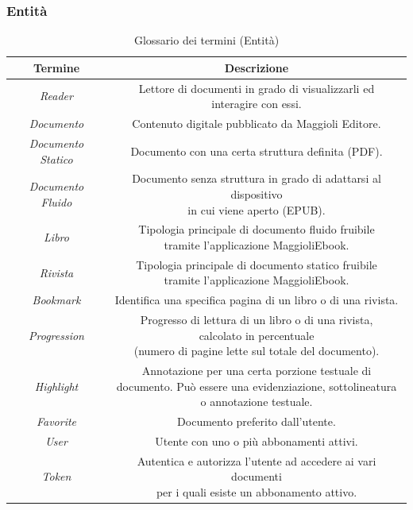 \subsubsection*{Entità}
\begin{table}[H]
\centering
    \begin{tabular}{|c|c|}
         \hline
         \textbf{Termine} & \textbf{Descrizione}\\
         \hline
         \textit{Reader} & \specialcell{Lettore di documenti in grado di visualizzarli ed \\interagire con essi.}\\
         \hline
         \textit{Documento} & Contenuto digitale pubblicato da Maggioli Editore.\\
         \hline
         \textit{Documento Statico} & Documento con una certa struttura definita (PDF).\\
         \hline
         \textit{Documento Fluido} & \specialcell{Documento senza struttura in grado di adattarsi al dispositivo\\ in cui viene aperto (EPUB).}\\
         \hline
         \textit{Libro} & \specialcell{Tipologia principale di documento fluido fruibile\\ tramite l'applicazione MaggioliEbook.}\\
         \hline
         \textit{Rivista} & \specialcell{Tipologia principale di documento statico fruibile\\ tramite l'applicazione MaggioliEbook.}\\
         \hline
         \textit{Bookmark} & Identifica una specifica pagina di un libro o di una rivista.\\
         \hline
         \textit{Progression} & \specialcell{Progresso di lettura di un libro o di una rivista,\\ calcolato in percentuale \\(numero di pagine lette sul totale del documento).}\\
         \hline
         \textit{Highlight} & \specialcell{Annotazione per una certa porzione testuale di \\documento. Può essere una evidenziazione, sottolineatura \\o annotazione testuale.}\\
         \hline
         \textit{Favorite} &  Documento preferito dall'utente.\\
         \hline
         \textit{User} & Utente con uno o più abbonamenti attivi.\\
         \hline
          \textit{Token} & \specialcell{Autentica e autorizza l'utente ad accedere ai vari documenti\\ per i quali esiste un abbonamento attivo.}\\
         \hline
    \end{tabular}
    \caption{Glossario dei termini (Entità)}
\end{table}

